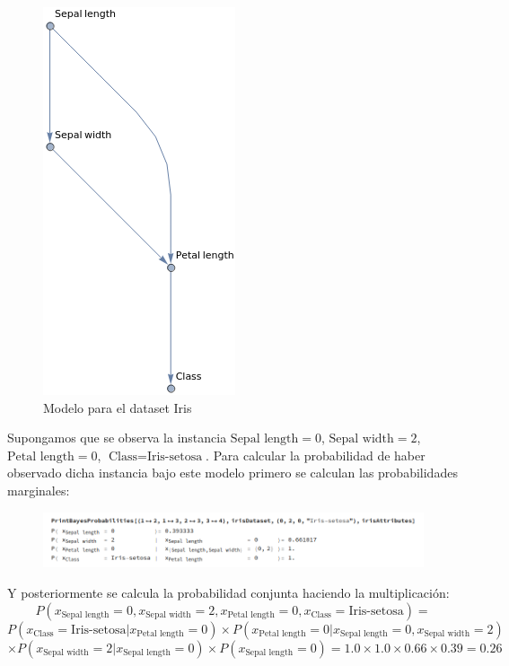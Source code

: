 \documentclass[10pt,a4paper]{article}
\begin{document}
\begin{figure}[h!tb!]
    \includegraphics[scale=0.4]{img/iris_graph.png}
    \centering
    \caption{Modelo para el dataset Iris}
    \label{fig:iris_graph}
\end{figure}

Supongamos que se observa la instancia $\text{Sepal length} = 0$, $\text{Sepal width} = 2$, $\text{Petal length} = 0$, $\text{Class} = \text{Iris-setosa}$. Para calcular la probabilidad de haber observado dicha instancia bajo este modelo primero se calculan las probabilidades marginales:

\begin{figure}[H]
    \includegraphics[scale=0.45]{img/inference_prob.png}
\end{figure}

Y posteriormente se calcula la probabilidad conjunta haciendo la multiplicación:
\[
	 P\left( x_\text{Sepal length} = 0, x_\text{Sepal width} = 2, x_\text{Petal length} = 0, x_\text{Class} = \text{Iris-setosa} \right) = 	 
\]
\[
	P(x_\text{Class} = \text{Iris-setosa} | x_\text{Petal length} = 0) \times P(x_\text{Petal length} = 0 | x_\text{Sepal length} = 0, x_\text{Sepal width} = 2)
\]
\[
	\times P(x_\text{Sepal width} = 2 | x_\text{Sepal length} = 0) \times P(x_\text{Sepal length} = 0) = 1.0 \times 1.0 \times 0.66 \times 0.39 = 0.26
\]
\end{document}
